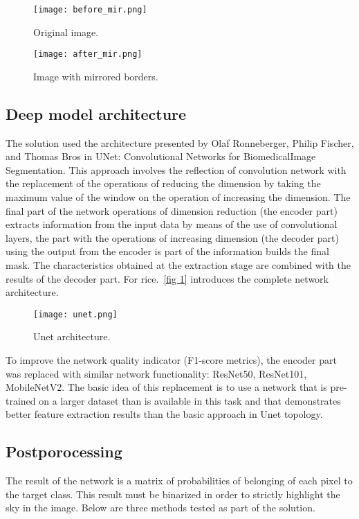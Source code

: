 \documentclass[runningheads]{llncs}
\begin{document}
\begin{figure}[H]
  \centering
  \begin{minipage}[b]{0.4\textwidth}
    \texttt{[image: before\_mir.png]}
    \caption{Original image.}
  \end{minipage}
  \hfill
  \begin{minipage}[b]{0.4\textwidth}
    \texttt{[image: after\_mir.png]}
    \caption{Image with mirrored borders.}
  \end{minipage}
\end{figure}

\subsection{Deep model architecture}

 The solution used the architecture presented by Olaf Ronneberger, Philip Fischer, and Thomas Bros in UNet: Convolutional Networks for BiomedicalImage Segmentation\cite{unet}. This approach involves the reflection of convolution network with the replacement of the operations of reducing the dimension by taking the maximum value of the window on the operation of increasing the dimension. The final part of the network operations of dimension reduction (the encoder part) extracts information from the input data by means of the use of convolutional layers, the part with the operations of increasing dimension (the decoder part) using the output from the encoder is part of the information builds the final mask. The characteristics obtained at the extraction stage are combined with the results of the decoder part. For rice.~\ref{fig 1} introduces the complete network architecture.

\begin{figure}[H]
\texttt{[image: unet.png]}
\caption{Unet architecture.} \label{fig1}
\end{figure}

 To improve the network quality indicator (F1-score metrics), the encoder part was replaced with similar network functionality: ResNet50\cite{resnet}, ResNet101\cite{resnet}, MobileNetV2\cite{mobnet}. The basic idea of this replacement is to use a network that is pre-trained on a larger dataset than is available in this task and that demonstrates better feature extraction results than the basic approach in Unet topology.

\subsection{Postporocessing}
The result of the network is a matrix of probabilities of belonging of each pixel to the target class. This result must be binarized in order to strictly highlight the sky in the image. Below are three methods tested as part of the solution.
\end{document}
